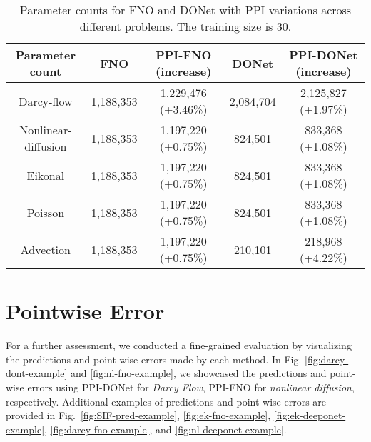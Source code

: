 \begin{table*}[t]
\caption{\small Parameter counts for FNO and DONet with PPI variations across different problems. The training size is 30. } \label{tb:paracounts}
\small
\centering
\begin{tabular}{ccccc}
\hline
\textbf{Parameter count} & \textbf{FNO} & \textbf{PPI-FNO (increase)} & \textbf{DONet} & \textbf{PPI-DONet (increase)} \\ 
\hline
Darcy-flow & 1,188,353 & 1,229,476 (+3.46\%) & 2,084,704 & 2,125,827 (+1.97\%) \\ 
Nonlinear-diffusion & 1,188,353 & 1,197,220 (+0.75\%) & 824,501 & 833,368 (+1.08\%) \\ 
Eikonal & 1,188,353 & 1,197,220 (+0.75\%) & 824,501 & 833,368 (+1.08\%) \\ 
Poisson & 1,188,353 & 1,197,220 (+0.75\%) & 824,501 & 833,368 (+1.08\%) \\ 
Advection & 1,188,353 & 1,197,220 (+0.75\%) & 210,101 & 218,968 (+4.22\%) \\ 
\hline
\end{tabular}
\end{table*}

\section{Pointwise Error}\label{sect:appendix:point-wise}
For a further assessment, we conducted a fine-grained evaluation by visualizing the predictions and point-wise errors made by each method. In Fig. \ref{fig:darcy-dont-example} and \ref{fig:nl-fno-example},  we showcased the predictions and point-wise errors using PPI-DONet for \textit{Darcy Flow}, PPI-FNO for \textit{nonlinear diffusion}, respectively. Additional examples of predictions and point-wise errors are provided in Fig.~\ref{fig:SIF-pred-example}, \ref{fig:ek-fno-example}, \ref{fig:ek-deeponet-example}, \ref{fig:darcy-fno-example}, and \ref{fig:nl-deeponet-example}. 
 
